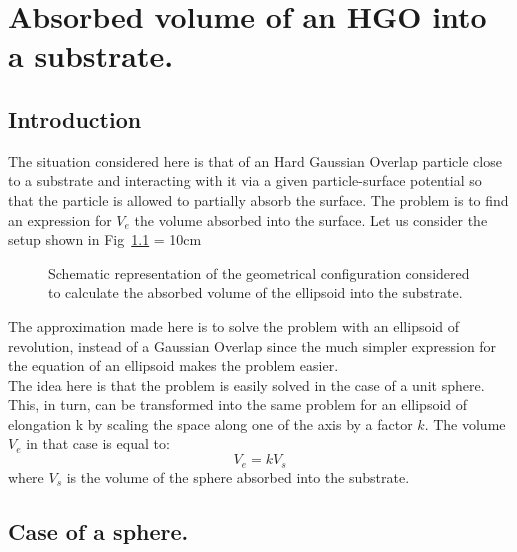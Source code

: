 

\chapter{Absorbed volume of an HGO into a substrate.}
\label{chap:A}

\section{Introduction}


The situation considered here is that of an Hard Gaussian Overlap particle close to a 
substrate and interacting
with it via a given particle-surface potential so that the particle is allowed to partially
absorb the surface. The problem is to find an expression for $V_e$ the volume absorbed into the
surface. Let us consider the setup shown in Fig~\ref{fig:scalingVe-Vs}
\picW = 10cm
\begin{figure}[h]
	\centering
	\caption{Schematic representation of the geometrical configuration considered to
	calculate the absorbed volume of the ellipsoid into the substrate.}
	\label{fig:scalingVe-Vs}
\end{figure}

The approximation made here is to solve the problem with an ellipsoid of revolution, instead of
a Gaussian Overlap since the much simpler expression for the equation of an ellipsoid makes the
problem easier.\\
The idea here is that the problem is easily solved in the case of a unit sphere. 
This, in turn, can be transformed into the same problem for an ellipsoid of elongation k by scaling the 
space along one  of the axis by a factor $k$. The volume $V_e$ in that case is equal to:
%
\begin{equation}
	V_e = kV_s
\end{equation}
where $V_s$ is the volume of the sphere absorbed into the substrate.


\section{Case of a sphere.}

